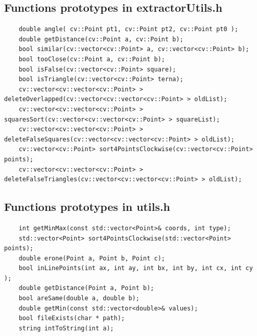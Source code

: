 	\subsection*{Functions prototypes in extractorUtils.h}
	\begin{lstlisting}
	double angle( cv::Point pt1, cv::Point pt2, cv::Point pt0 );
	double getDistance(cv::Point a, cv::Point b);
	bool similar(cv::vector<cv::Point> a, cv::vector<cv::Point> b);
	bool tooClose(cv::Point a, cv::Point b);
	bool isFalse(cv::vector<cv::Point> square);
	bool isTriangle(cv::vector<cv::Point> terna);
	cv::vector<cv::vector<cv::Point> > deleteOverlapped(cv::vector<cv::vector<cv::Point> > oldList);
	cv::vector<cv::vector<cv::Point> > squaresSort(cv::vector<cv::vector<cv::Point> > squareList);
	cv::vector<cv::vector<cv::Point> > deleteFalseSquares(cv::vector<cv::vector<cv::Point> > oldList);
	cv::vector<cv::Point> sort4PointsClockwise(cv::vector<cv::Point> points);
	cv::vector<cv::vector<cv::Point> > deleteFalseTriangles(cv::vector<cv::vector<cv::Point> > oldList);
	\end{lstlisting}

	\subsection*{Functions prototypes in utils.h}
	\begin{lstlisting}
	int getMinMax(const std::vector<Point>& coords, int type);
	std::vector<Point> sort4PointsClockwise(std::vector<Point> points);
	double erone(Point a, Point b, Point c);
	bool inLinePoints(int ax, int ay, int bx, int by, int cx, int cy );
	double getDistance(Point a, Point b);
	bool areSame(double a, double b);
	double getMin(const std::vector<double>& values);
	bool fileExists(char * path);
	string intToString(int a);
	\end{lstlisting}


	
